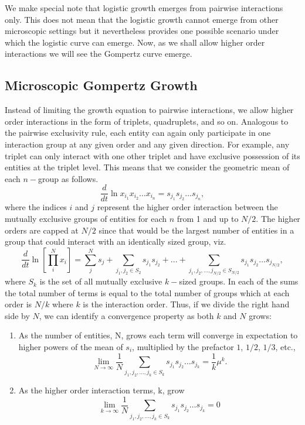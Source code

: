 \documentclass{article}
\begin{document}
We make special note that logistic growth emerges from pairwise interactions only. This does not mean that the logistic growth cannot emerge from other microscopic settings but it nevertheless provides one possible scenario under which the logistic curve can emerge. Now, as we shall allow higher order interactions we will see the Gompertz curve emerge.

\subsection{Microscopic Gompertz Growth}

Instead of limiting the growth equation to pairwise interactions, we allow higher order interactions in the form of triplets, quadruplets, and so on. Analogous to the pairwise exclusivity rule, each entity can again only participate in one interaction group at any given order and any given direction. For example, any triplet can only interact with one other triplet and have exclusive possession of its entities at the triplet level. This means that we consider the geometric mean of each $n-$group as follows.
\begin{equation}
\label{eq:modSIR4}
\frac{d}{dt} \ln x_{i_1} x_{i_2} \dots x_{i_n} = s_{j_1}s_{j_2}\dots s_{j_n}, 
\end{equation}
where the indices $i$ and $j$ represent the higher order interaction between the mutually exclusive groups of entities for each $n$ from 1 and up to $N/2$. The higher orders are capped at $N/2$ since that would be the largest number of entities in a group that could interact with an identically sized group, viz.
\begin{equation}
\label{eq:MicroGomp0}
\frac{d}{dt} \ln \left[ \prod_i^N x_i \right ] = \sum_j^N s_{j} + \sum_{j_1, j_2 \in S_2} s_{j_1}s_{j_2} + ... + \sum_{j_1, j_2, ..., j_{N/2} \in S_{N/2}} s_{j_1}s_{j_2}\dots s_{j_{N/2}},
\end{equation}
where $S_k$ is the set of all mutually exclusive $k-$sized groups. In each of the sums the total number of terms is equal to the total number of groups which at each order is $N/k$ where $k$ is the interaction order. Thus, if we divide the right hand side by $N$, we can identify a convergence property as both $k$ and $N$ grows:
\begin{enumerate}
\item As the number of entities, N, grows each term will converge in expectation to higher powers of the mean of $s_i$, multiplied by the prefactor $1$, $1/2$, $1/3$, etc., 
\begin{equation}
\label{eq:MicroGomp11}
\lim_{N\rightarrow \infty} \frac{1}{N}\sum_{j_1, j_2, ..., j_k \in S_k} s_{j_1}s_{j_2}\dots s_{j_k} = \frac{1}{k} \mu^{k}.
\end{equation}
\item As the higher order interaction terms, k, grow
\begin{equation}
\label{eq:MicroGomp12}
\lim_{k\rightarrow \infty} \frac{1}{N}\sum_{j_1, j_2, ..., j_k \in S_k} s_{j_1}s_{j_2}\dots s_{j_k} = 0
\end{equation}
\end{enumerate}
\end{document}
